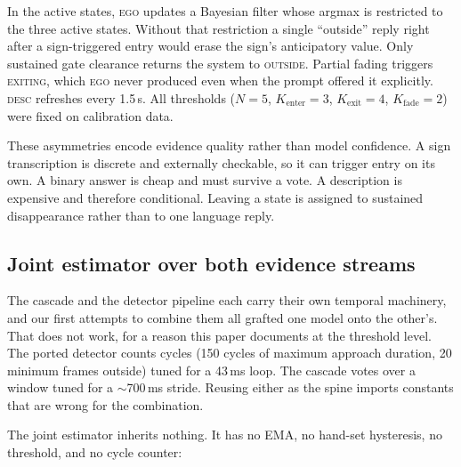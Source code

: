 \documentclass[journal]{IEEEtran}
\newcommand{\st}[1]{\textsc{#1}}
\begin{document}
In the active states, \st{ego} updates a Bayesian filter whose argmax is restricted to the three active states.  Without that restriction a single ``outside'' reply right after a sign-triggered entry would erase the sign's anticipatory value.  Only sustained gate clearance returns the system to \st{outside}.  Partial fading triggers \st{exiting}, which \st{ego} never produced even when the prompt offered it explicitly.  \st{desc} refreshes every 1.5\,s.  All thresholds ($N{=}5$, $K_\text{enter}{=}3$, $K_\text{exit}{=}4$, $K_\text{fade}{=}2$) were fixed on calibration data.

These asymmetries encode evidence quality rather than model confidence.  A sign transcription is discrete and externally checkable, so it can trigger entry on its own.  A binary answer is cheap and must survive a vote.  A description is expensive and therefore conditional.  Leaving a state is assigned to sustained disappearance rather than to one language reply.

\subsection{Joint estimator over both evidence streams}
\label{sec:jointdesign}

The cascade and the detector pipeline each carry their own temporal machinery, and our first attempts to combine them all grafted one model onto the other's. That does not work, for a reason this paper documents at the threshold level. The ported detector counts cycles (150 cycles of maximum approach duration, 20 minimum frames outside) tuned for a 43\,ms loop.  The cascade votes over a window tuned for a $\sim$700\,ms stride.  Reusing either as the spine imports constants that are wrong for the combination.

The joint estimator inherits nothing.  It has no EMA, no hand-set hysteresis, no threshold, and no cycle counter:
\end{document}

